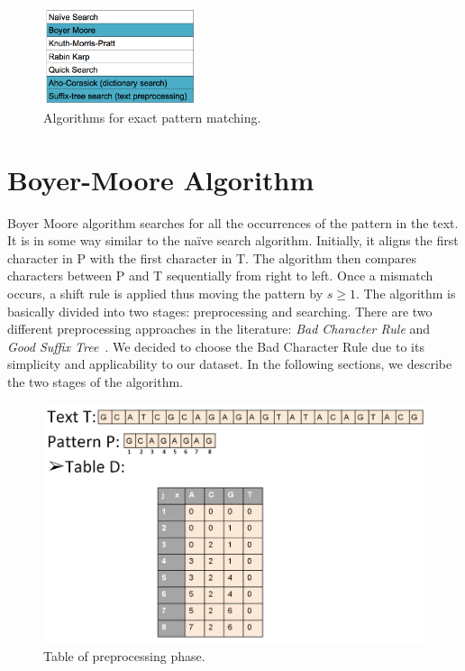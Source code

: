 \documentclass[paper=a4, fontsize=11pt]{scrartcl} %
\numberwithin{equation}{section} %
\numberwithin{figure}{section} %
\numberwithin{table}{section} %
\begin{document}
\begin{figure}[h!]
\centering
\includegraphics[width=0.4\textwidth]{figures/algorithms.png}
\caption{Algorithms for exact pattern matching.}
\label{fig:algorithms}
\end{figure}

\newpage
\section{Boyer-Moore Algorithm}
\par Boyer Moore algorithm \cite{bm_fast} searches for all the occurrences of the pattern in the text. It is in some way similar to the na\"ive search algorithm. Initially, it aligns the first character in P with the first character in T. The algorithm then compares characters between P and T sequentially from right to left. Once a mismatch occurs, a shift rule is applied thus moving the pattern by $s\ge 1$. The algorithm is basically divided into two stages: preprocessing and searching. There are two different preprocessing approaches in the literature: \textit{Bad Character Rule} and \textit{Good Suffix Tree}~\cite{bm_tbc}. We decided to choose the Bad Character Rule due to its simplicity and applicability to our dataset. In the following sections, we describe the two stages of the algorithm.

\begin{figure}[h!]
\centering
\includegraphics[width=\textwidth]{figures/Example_Table.png}
\caption{Table of preprocessing phase.}
\label{fig:table}
\end{figure}
\end{document}
